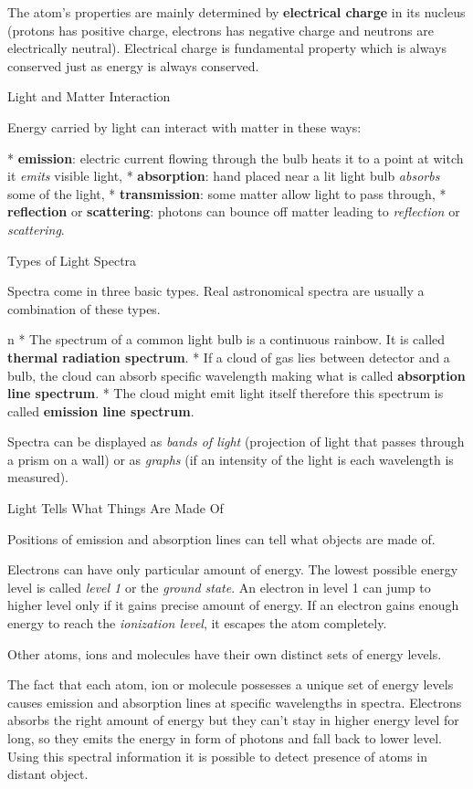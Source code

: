The atom's properties are mainly determined by {\bf electrical charge} in its
nucleus (protons has positive charge, electrons has negative charge
and neutrons are electrically neutral). Electrical charge is fundamental
property which is always conserved just as energy is always conserved.

\sec Light and Matter Interaction

Energy carried by light can interact with matter in these ways:

\begitems
* {\bf emission}: electric current flowing through the bulb heats it to a point
at witch it {\em emits} visible light,
* {\bf absorption}: hand placed near a lit light bulb {\em absorbs} some
of the light,
* {\bf transmission}: some matter allow light to pass through,
* {\bf reflection} or {\bf scattering}: photons can bounce off matter leading to
{\em reflection} or {\em scattering}.
\enditems

\sec Types of Light Spectra

Spectra come in three basic types. Real astronomical spectra are usually
a combination of these types.

\begitems \style n
* The spectrum of a common light bulb is a continuous rainbow. It is called
{\bf thermal radiation spectrum}.
* If a cloud of gas lies between detector and a bulb, the cloud can absorb
specific wavelength making what is called {\bf absorption line spectrum}.
* The cloud might emit light itself therefore this spectrum is called
{\bf emission line spectrum}.
\enditems

Spectra can be displayed as {\em bands of light} (projection of light that
passes through a prism on a wall) or as {\em graphs} (if an intensity
of the light is each wavelength is measured).

\sec Light Tells What Things Are Made Of

Positions of emission and absorption lines can tell what objects are made of.

Electrons can have only particular amount of energy. The lowest possible energy
level is called {\em level 1} or the {\em ground state}. An electron in level 1
can jump to higher level only if it gains precise amount of energy. If
an electron gains enough energy to reach the {\em ionization level}, it escapes
the atom completely.

Other atoms, ions and molecules have their own distinct sets of energy levels.

The fact that each atom, ion or molecule possesses a unique set of energy levels
causes emission and absorption lines at specific wavelengths in spectra.
Electrons absorbs the right amount of energy but they can't stay in higher
energy level for long, so they emits the energy in form of photons and fall
back to lower level. Using this spectral information it is possible to detect
presence of atoms in distant object.

